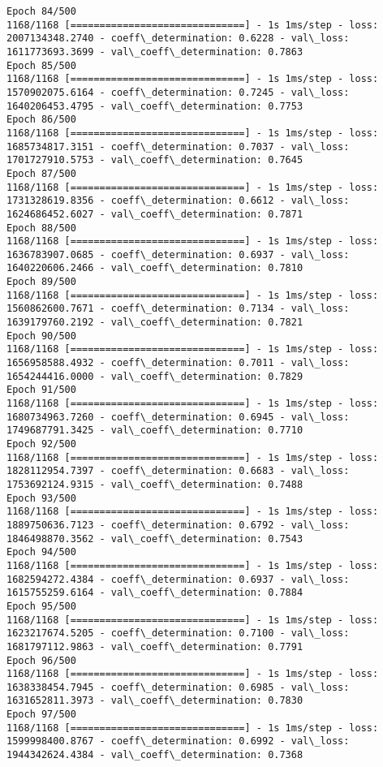 \documentclass[11pt]{article}
\begin{document}
\begin{Verbatim}[commandchars=\\\{\}]
Epoch 84/500
1168/1168 [==============================] - 1s 1ms/step - loss: 2007134348.2740 - coeff\_determination: 0.6228 - val\_loss: 1611773693.3699 - val\_coeff\_determination: 0.7863
Epoch 85/500
1168/1168 [==============================] - 1s 1ms/step - loss: 1570902075.6164 - coeff\_determination: 0.7245 - val\_loss: 1640206453.4795 - val\_coeff\_determination: 0.7753
Epoch 86/500
1168/1168 [==============================] - 1s 1ms/step - loss: 1685734817.3151 - coeff\_determination: 0.7037 - val\_loss: 1701727910.5753 - val\_coeff\_determination: 0.7645
Epoch 87/500
1168/1168 [==============================] - 1s 1ms/step - loss: 1731328619.8356 - coeff\_determination: 0.6612 - val\_loss: 1624686452.6027 - val\_coeff\_determination: 0.7871
Epoch 88/500
1168/1168 [==============================] - 1s 1ms/step - loss: 1636783907.0685 - coeff\_determination: 0.6937 - val\_loss: 1640220606.2466 - val\_coeff\_determination: 0.7810
Epoch 89/500
1168/1168 [==============================] - 1s 1ms/step - loss: 1560862600.7671 - coeff\_determination: 0.7134 - val\_loss: 1639179760.2192 - val\_coeff\_determination: 0.7821
Epoch 90/500
1168/1168 [==============================] - 1s 1ms/step - loss: 1656958588.4932 - coeff\_determination: 0.7011 - val\_loss: 1654244416.0000 - val\_coeff\_determination: 0.7829
Epoch 91/500
1168/1168 [==============================] - 1s 1ms/step - loss: 1680734963.7260 - coeff\_determination: 0.6945 - val\_loss: 1749687791.3425 - val\_coeff\_determination: 0.7710
Epoch 92/500
1168/1168 [==============================] - 1s 1ms/step - loss: 1828112954.7397 - coeff\_determination: 0.6683 - val\_loss: 1753692124.9315 - val\_coeff\_determination: 0.7488
Epoch 93/500
1168/1168 [==============================] - 1s 1ms/step - loss: 1889750636.7123 - coeff\_determination: 0.6792 - val\_loss: 1846498870.3562 - val\_coeff\_determination: 0.7543
Epoch 94/500
1168/1168 [==============================] - 1s 1ms/step - loss: 1682594272.4384 - coeff\_determination: 0.6937 - val\_loss: 1615755259.6164 - val\_coeff\_determination: 0.7884
Epoch 95/500
1168/1168 [==============================] - 1s 1ms/step - loss: 1623217674.5205 - coeff\_determination: 0.7100 - val\_loss: 1681797112.9863 - val\_coeff\_determination: 0.7791
Epoch 96/500
1168/1168 [==============================] - 1s 1ms/step - loss: 1638338454.7945 - coeff\_determination: 0.6985 - val\_loss: 1631652811.3973 - val\_coeff\_determination: 0.7830
Epoch 97/500
1168/1168 [==============================] - 1s 1ms/step - loss: 1599998400.8767 - coeff\_determination: 0.6992 - val\_loss: 1944342624.4384 - val\_coeff\_determination: 0.7368

\end{Verbatim}
\end{document}

